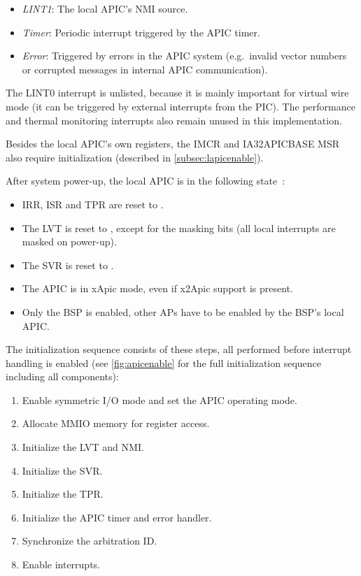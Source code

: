 \begin{itemize}
  \item \textit{LINT1}: The local APIC's NMI source.
  \item \textit{Timer}: Periodic interrupt triggered by the APIC timer.
  \item \textit{Error}: Triggered by errors in the APIC system (e.g.\ invalid vector numbers or corrupted messages in internal APIC communication).
\end{itemize}

The LINT0 interrupt is unlisted, because it is mainly important for virtual wire mode (it can be triggered by external interrupts from the PIC).
The performance and thermal monitoring interrupts also remain unused in this implementation.

Besides the local APIC's own registers, the IMCR and IA32\textunderscore{}APIC\textunderscore{}BASE MSR also require initialization (described in \autoref{subsec:lapicenable}).

After system power-up, the local APIC is in the following state~\autocite[sec.~3.11.4.7]{ia32}:

\begin{itemize}
  \item IRR, ISR and TPR are reset to .
  \item The LVT is reset to , except for the masking bits (all local interrupts are masked on power-up).
  \item The SVR is reset to .
  \item The APIC is in xApic mode, even if x2Apic support is present.
  \item Only the BSP is enabled, other APs have to be enabled by the BSP's local APIC\@.
\end{itemize}

The initialization sequence consists of these steps, all performed before interrupt handling is enabled (see \autoref{fig:apicenable} for the full initialization sequence including all components):

\begin{enumerate}
  \item Enable symmetric I/O mode and set the APIC operating mode.
  \item Allocate MMIO memory for register access.
  \item Initialize the LVT and NMI\@.
  \item Initialize the SVR\@.
  \item Initialize the TPR\@.
  \item Initialize the APIC timer and error handler.
  \item Synchronize the arbitration ID\@.
  \item Enable interrupts.
\end{enumerate}

